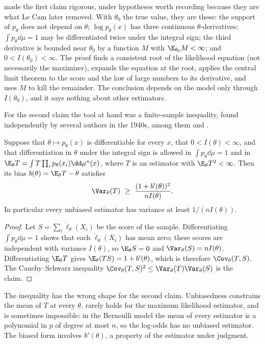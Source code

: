 \begin{refsection}
\textcite{Cramer1946} made the first claim rigorous, under hypotheses worth recording because they are what Le Cam later removed. With $\theta_0$ the true value, they are these: the support of $p_\theta$ does not depend on $\theta$; $\log p_\theta(x)$ has three continuous $\theta$-derivatives; $\int p_\theta\dd\mu=1$ may be differentiated twice under the integral sign; the third derivative is bounded near $\theta_0$ by a function $M$ with $\E_{\theta_0}M<\infty$; and $0<I(\theta_0)<\infty$. The proof finds a consistent root of the likelihood equation (not necessarily the maximizer), expands the equation at the root, applies the central limit theorem to the score and the law of large numbers to its derivative, and uses $M$ to kill the remainder. The conclusion depends on the model only through $I(\theta_0)$, and it says nothing about other estimators.

For the second claim the tool at hand was a finite-sample inequality, found independently by several authors in the 1940s, among them \textcite{Rao1945} and \textcite{Cramer1946}.

\begin{theorem}\label{thm:lecam:cramer-rao}
Suppose that $\theta\mapsto p_\theta(x)$ is differentiable for every $x$, that $0<I(\theta)<\infty$, and that differentiation in $\theta$ under the integral sign is allowed in $\int p_\theta\dd\mu=1$ and in $\E_\theta T=\int T\prod_ip_\theta(x_i)\dd\mu^n(x)$, where $T$ is an estimator with $\E_\theta T^2<\infty$. Then its bias $b(\theta)=\E_\theta T-\theta$ satisfies
\[
  \Var_\theta(T)\ \ge\ \frac{(1+b'(\theta))^2}{nI(\theta)}.
\]
In particular every unbiased estimator has variance at least $1/(nI(\theta))$.
\end{theorem}

\begin{proof}
Let $S=\sum_i\dot\ell_\theta(X_i)$ be the score of the sample. Differentiating $\int p_\theta\dd\mu=1$ shows that each $\dot\ell_\theta(X_i)$ has mean zero; these scores are independent with variance $I(\theta)$, so $\E_\theta S=0$ and $\Var_\theta(S)=nI(\theta)$. Differentiating $\E_\theta T$ gives $\E_\theta(TS)=1+b'(\theta)$, which is therefore $\Cov_\theta(T,S)$. The Cauchy--Schwarz inequality $\Cov_\theta(T,S)^2\le\Var_\theta(T)\Var_\theta(S)$ is the claim.
\end{proof}

The inequality has the wrong shape for the second claim. Unbiasedness constrains the mean of $T$ at every $\theta$, rarely holds for the maximum likelihood estimator, and is sometimes impossible: in the Bernoulli model the mean of every estimator is a polynomial in $p$ of degree at most $n$, so the log-odds has no unbiased estimator. The biased form involves $b'(\theta)$, a property of the estimator under judgment.


\end{refsection}
